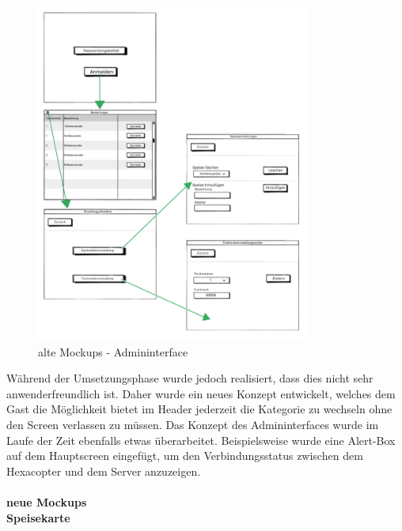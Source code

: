 			\begin{figure}[H]
			\begin{centering}
			\includegraphics[width = 0.8\textwidth]{Bilder/Jok_alte_mockups_admin}
			\par\end{centering}
			\caption{alte Mockups - Admininterface}
			\label{alte Mockups}
			\end{figure}Während der Umsetzungsphase wurde jedoch realisiert, dass dies nicht sehr anwenderfreundlich ist. Daher wurde ein neues Konzept entwickelt, welches dem Gast die Möglichkeit bietet im Header jederzeit die Kategorie zu wechseln ohne den Screen verlassen zu müssen. Das Konzept des Admininterfaces wurde im Laufe der Zeit ebenfalls etwas überarbeitet. Beispielsweise wurde eine Alert-Box auf dem Hauptscreen eingefügt, um den Verbindungsstatus zwischen dem Hexacopter und dem Server anzuzeigen.
\\ \\
\textbf{neue Mockups}\\
\textbf{Speisekarte}\\
